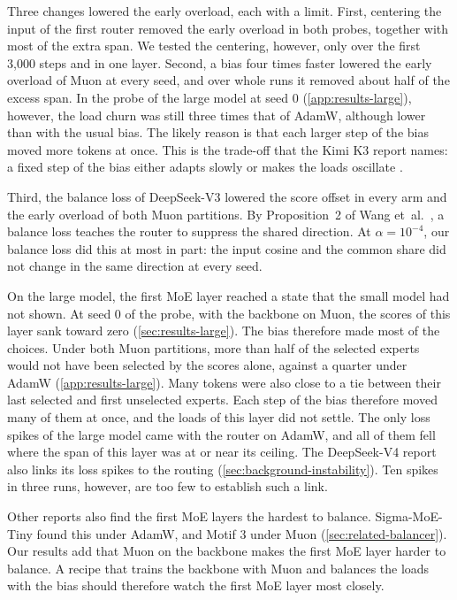 Three changes lowered the early overload, each with a limit. First, centering the input of the first router removed the early overload in both probes, together with most of the extra span. We tested the centering, however, only over the first 3,000 steps and in one layer. Second, a bias four times faster lowered the early overload of Muon at every seed, and over whole runs it removed about half of the excess span. In the probe of the large model at seed 0 (\cref{app:results-large}), however, the load churn was still three times that of AdamW, although lower than with the usual bias. The likely reason is that each larger step of the bias moved more tokens at once. This is the trade-off that the Kimi K3 report names: a fixed step of the bias either adapts slowly or makes the loads oscillate \cite{kimi2026k3}.

Third, the balance loss of DeepSeek-V3 lowered the score offset in every arm and the early overload of both Muon partitions. By Proposition~2 of Wang et~al.~\cite{wang2026myth}, a balance loss teaches the router to suppress the shared direction. At $\alpha = 10^{-4}$, our balance loss did this at most in part: the input cosine and the common share did not change in the same direction at every seed.

On the large model, the first MoE layer reached a state that the small model had not shown. At seed 0 of the probe, with the backbone on Muon, the scores of this layer sank toward zero (\cref{sec:results-large}). The bias therefore made most of the choices. Under both Muon partitions, more than half of the selected experts would not have been selected by the scores alone, against a quarter under AdamW (\cref{app:results-large}). Many tokens were also close to a tie between their last selected and first unselected experts. Each step of the bias therefore moved many of them at once, and the loads of this layer did not settle. The only loss spikes of the large model came with the router on AdamW, and all of them fell where the span of this layer was at or near its ceiling. The DeepSeek-V4 report also links its loss spikes to the routing (\cref{sec:background-instability}). Ten spikes in three runs, however, are too few to establish such a link.

Other reports also find the first MoE layers the hardest to balance. Sigma-MoE-Tiny found this under AdamW, and Motif 3 under Muon (\cref{sec:related-balancer}). Our results add that Muon on the backbone makes the first MoE layer harder to balance. A recipe that trains the backbone with Muon and balances the loads with the bias should therefore watch the first MoE layer most closely.

